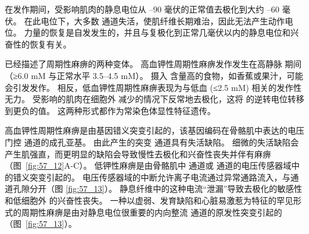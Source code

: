 在发作期间，受影响肌肉的静息电位从 –90 毫伏的正常值去极化到大约 –60 毫伏。
在此电位下，大多数  通道失活，使肌纤维长期难治，因此无法产生动作电位。
力量的恢复是自发发生的，并且与复极化到正常几毫伏以内的静息电位和兴奋性的恢复有关。


已经描述了周期性麻痹的两种变体。
高血钾性周期性麻痹发作发生在高静脉  期间（≥6.0 mM 与正常水平 3.5–4.5 mM）。
摄入  含量高的食物，如香蕉或果汁，可能会引发发作。
相反，低血钾性周期性麻痹表现为与低血  (≤2.5 mM) 相关的发作性无力。
受影响的肌肉在细胞外  减少的情况下反常地去极化，这将  的逆转电位转移到更负的值。
这两种形式都作为常染色体显性特征遗传。


高血钾性周期性麻痹是由基因错义突变引起的，该基因编码在骨骼肌中表达的电压门控  通道的成孔亚基。
由此产生的突变  通道具有失活缺陷。
细微的失活缺陷会产生肌强直，而更明显的缺陷会导致慢性去极化和兴奋性丧失并伴有麻痹（图~\ref{fig:57_12}A-C）。
低钾性麻痹是由骨骼肌中  通道或  通道的电压传感器域中的错义突变引起的。
电压传感器域的中断允许离子电流通过异常通路流入，与通道孔隙分开（图 \ref{fig:57_13}）。
静息纤维中的这种电流“泄漏”导致去极化的敏感性和低细胞外  的兴奋性丧失。
一种以虚弱、发育缺陷和心脏易激惹为特征的罕见形式的周期性麻痹是由对静息电位很重要的内向整流  通道的原发性突变引起的（图~\ref{fig:57_13}）。


